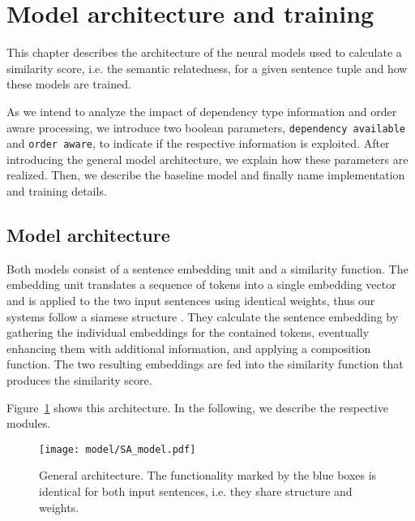 \section{Model architecture and training}
This chapter describes the architecture of the neural models used to calculate a similarity score, i.e. the semantic relatedness, for a given sentence tuple and how these models are trained. 

As we intend to analyze the impact of dependency type information and order aware processing, we introduce two boolean parameters, \texttt{dependency available} and \texttt{order aware}, to indicate if the respective information is exploited. After introducing the general model architecture, we explain how these parameters are realized. Then, we describe the baseline model and finally name implementation and training details.


\subsection{Model architecture} \label{subsec:architecture}
Both models consist of a sentence embedding unit and a similarity function. The embedding unit translates a sequence of tokens into a single embedding vector and is applied to the two input sentences using identical weights, thus our systems follow a siamese structure \autocite{bromley_signature_1994}. %
They calculate the sentence embedding by gathering the individual embeddings for the contained tokens, eventually enhancing them with additional information, and applying a composition function. The two resulting embeddings are fed into the similarity function that produces the similarity score. 

Figure~\ref{fig:model_architecture} shows this architecture. In the following, we describe the respective modules. 

\begin{figure}[htb!]
	\centering
	\texttt{[image: model/SA\_model.pdf]}
	\caption{General architecture. The functionality marked by the blue boxes is identical for both input sentences, i.e. they share structure and weights.}
	\label{fig:model_architecture}
\end{figure}


